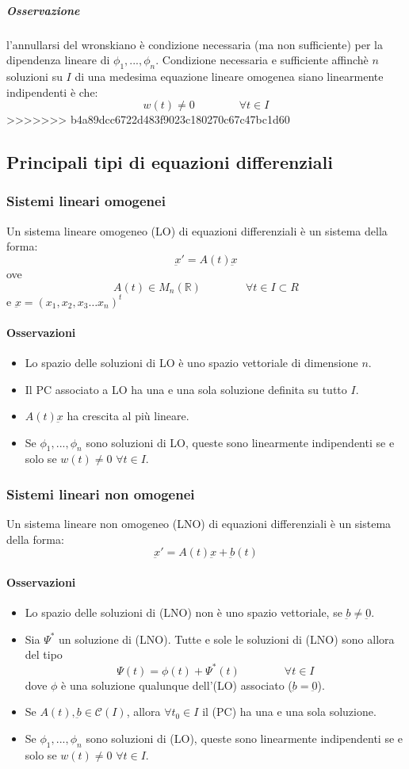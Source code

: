\documentclass[a4paper,12pt]{article}
\newcommand{\cont}{\mathscr{C}}
\begin{document}
\subparagraph*{Osservazione} l'annullarsi del wronskiano è condizione necessaria (ma non sufficiente) per la dipendenza lineare di $\phi_1,...,\phi_n$. 
Condizione necessaria e sufficiente affinchè $n$ soluzioni su $I$ di una medesima equazione lineare omogenea siano linearmente indipendenti è che:
$$ w(t)\neq0 \qquad\qquad \forall t \in I$$
>>>>>>> b4a89dcc6722d483f9023c180270c67c47bc1d60


\subsection{Principali tipi di equazioni differenziali}
\subsubsection{Sistemi lineari omogenei}
Un sistema lineare omogeneo (LO) di equazioni differenziali è un sistema della forma:
$$\underbar{x}' = A(t)\underbar{x}$$ 
ove $$A(t)\in M_n(\mathbb{R})\qquad \qquad \forall t\in I\subset R$$ e $\underbar{x} = (x_1,x_2,x_3 \dots x_n)^t$
\paragraph{Osservazioni}
\begin{itemize}
 \item Lo spazio delle soluzioni di LO è uno spazio vettoriale di dimensione $n$.
 \item Il PC associato a LO ha una e una sola soluzione definita su tutto $I$.
 \item $A(t)\underbar{x}$ ha crescita al più lineare.
 \item Se $\phi_1,...,\phi_n$ sono soluzioni di LO, queste sono linearmente indipendenti se e solo se $w(t)\neq0$ $\forall t \in I$.
\end{itemize}


\subsubsection{Sistemi lineari non omogenei}
Un sistema lineare non omogeneo (LNO) di equazioni differenziali è un sistema della forma:
$$\underbar{x}' = A(t)\underbar{x} + \underbar{b}(t)$$
\paragraph{Osservazioni}
\begin{itemize}
 \item Lo spazio delle soluzioni di (LNO) non è uno spazio vettoriale, se $\underbar{b}\neq\underbar{0}$.
 \item Sia $\Psi^*$ un soluzione di (LNO). Tutte e sole le soluzioni di (LNO) sono allora del tipo
       $$ \Psi(t) = \phi(t) + \Psi^*(t)\qquad \qquad \forall t \in I$$
       dove $\phi$ è una soluzione qualunque dell'(LO) associato ($\underbar{b}=\underbar{0}$).
 \item Se $A(t) , \underbar{b}\in \cont(I)$, allora $ \forall t_0 \in I$ il (PC)  ha una e una sola soluzione.
 \item Se $\phi_1,...,\phi_n$ sono soluzioni di (LO), queste sono linearmente indipendenti se e solo se $w(t)\neq0$ $\forall t \in I$.
\end{itemize}
\end{document}
